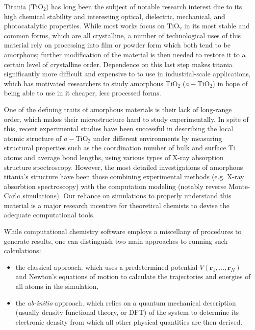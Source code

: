 \documentclass[aps,prb,twocolumn,amsmath,amssymb,superscriptaddress,longbibliography]{revtex4-1}
\newcommand\tab[1][1cm]{\hspace*{#1}} %
\begin{document}
\tab Titania ($\text{TiO}_2$) has long been the subject of notable research interest due to its high chemical stability and interesting optical, dielectric, mechanical, and photocatalytic properties\cite{optical,thin-film,mechanical,photocatalytic}. 
While most works focus on $\text{TiO}_2$ in its most stable and common forms, which are all crystalline, a number of technological uses of this material rely on processing into film or powder form which both tend to be amorphous; further modification of the material is then needed to restore it to a certain level of crystalline order\cite{a2c,ab_initio}.
Dependence on this last step makes titania significantly more difficult and expensive to to use in industrial-scale applications, which has motivated researchers to study amorphous $\text{TiO}_2$ ($a-\text{TiO}_2$) in hope of being able to use in it cheaper, less processed forms\cite{useful1,useful2,useful3}. 

\tab One of the defining traits of amorphous materials is their lack of long-range order, which makes their microstructure hard to study experimentally.
In spite of this, recent experimental studies have been successful in describing the local atomic structure of $a-\text{TiO}_2$ under different environments\cite{exptl1,exptl2,exptl3} by measuring structural properties such as the coordination number of bulk and surface Ti atoms and average bond lengths, using various types of X-ray absorption structure spectroscopy.
However, the most detailed investigations of amorphous titania's structure have been those combining experimental methods (e.g. X-ray absorbtion spectroscopy) with the computation modeling (notably reverse Monte-Carlo simulations)\cite{comp_exptl1,comp_exptl2,comp_exptl3}.
Our reliance on simulations to properly understand this material is a major research incentive for theoretical chemists to devise the adequate computational tools.

\tab While computational chemistry software employs a miscellany of procedures to generate results, one can distinguish two main approaches to running such calculations:

\begin{itemize}
\item the classical approach, which uses a predetermined potential ${V(\textbf{r}_1,...,\textbf{r}_N)}$ and Newton's equations of motion to calculate the trajectories and energies of all atoms in the simulation,
\item the \textit{ab-initio} approach, which relies on a quantum mechanical description (usually density functional theory, or DFT) of the system to determine its electronic density from which all other physical quantities are then derived.
\end{itemize}
\end{document}
